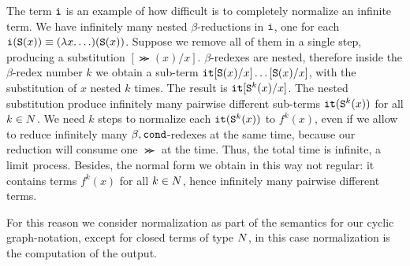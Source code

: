 The term ${\tt i}$ is an example of how difficult is to completely normalize
an infinite term. We have infinitely many nested $\beta$-reductions in
${\tt i}$, one for each ${\tt i}({\tt S} (x)) \equiv (\lambda x.\ldots)({\tt S} (x))$. 
Suppose we remove all of them in a single step, producing a substitution
$[\Succ (x)/x]$. $\beta$-redexes are nested, therefore 
inside the $\beta$-redex number $k$ we obtain a sub-term ${\tt it}[{\tt S} (x)/x]
\ldots[{\tt S} (x)/x]$, with the substitution of $x$ nested $k$ times. 
The result is ${\tt it}[{\tt S} ^k(x)/x]$.
The nested substitution produce infinitely many pairwise different sub-terms 
${\tt it}({\tt S} ^k(x))$ for all $k \in {N}$. 
We need $k$ steps to normalize each ${\tt it}({\tt S} ^k(x))$ to $f^k(x)$, 
even if we allow to reduce infinitely many 
$\beta, {\tt cond}$-redexes at the same time, because our reduction will consume one 
$\Succ$  at the time. Thus, the total time is infinite, a limit process. 
Besides, the normal form we obtain in this way not regular: it contains terms 
$f^k(x)$ for all $k \in {N}$, hence infinitely many pairwise different terms. 

For this reason we consider normalization as part of the semantics for
our cyclic graph-notation, except for closed terms of type ${N}$, 
in this case normalization is the computation of the output.




